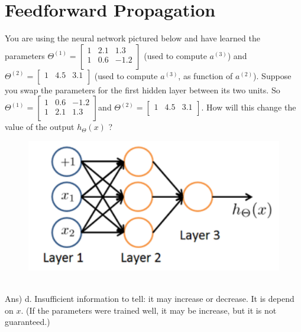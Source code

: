 \documentclass[12pt]{article}%
\begin{document}
\section{Feedforward Propagation}
 You are using the neural network pictured below and have learned the parameters $\Theta^{(1)} = \begin{bmatrix}
	1 & 2.1 & 1.3 \\
	1 & 0.6 & -1.2 \\
\end{bmatrix}$ (used to compute $a^{(3)}$) and $\Theta^{(2)} = \begin{bmatrix}
	1 & 4.5 & 3.1 \\
\end{bmatrix}$  (used to compute $a^{(3)}$, as function of $a^{(2)}$). Suppose you swap the parameters for the first hidden layer between its two units. So  $\Theta^{(1)} = \begin{bmatrix}
	1 & 0.6 & -1.2 \\
	1 & 2.1 & 1.3 \\
\end{bmatrix}$and $\Theta^{(2)} = \begin{bmatrix}
	1 & 4.5 & 3.1 \\
\end{bmatrix}$. How will this change the value of the output $h_{\Theta}(x)$ ? 
\begin{figure}[h]
	\centering
	\includegraphics[scale=0.3]{HW6_fig1.png}
\end{figure}
\\
Ans) d. Insufficient information to tell: it may increase or decrease. It is depend on $x$. (If the parameters were trained well, it may be increase, but it is not guaranteed.)
\end{document}
